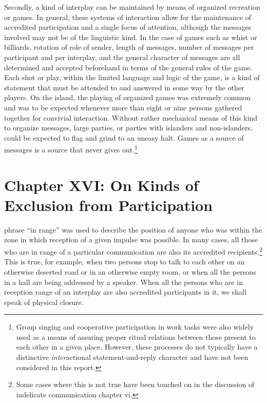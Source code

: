 \documentclass[openany,nobib]{tufte-book}
\let\oldchapter\chapter
\def\chapter{%
  \setcounter{footnote}{0}%
  \oldchapter
}
\begin{document}
Secondly, a kind of interplay can be maintained by means of organized
recreation or games. In general, these systems of interaction allow for
the maintenance of accredited participation and a single focus of
attention, although the messages involved may not be of the linguistic
kind. In the case of games such as whist or billiards, rotation of role
of sender, length of messages, number of messages per participant and
per interplay, and the general character of messages are all determined
and accepted beforehand in terms of the general rules of the game. Each
shot or play, within the limited language and logic of the game, is a
kind of statement that must be attended to and answered in some way by
the other players. On the island, the playing of organized games was
extremely common and was to be expected whenever more than eight or nine
persons gathered together for convivial interaction. Without rather
mechanical means of this kind to organize messages, large parties, or
parties with islanders and non-islanders, could be expected to flag and
grind to an uneasy halt. Games as a source of messages is a source that
never gives out.\footnote{Group singing and cooperative participation in
  work tasks were also widely used as a means of assuring proper ritual
  relations between those present to each other in a given place.
  However, these processes do not typically have a distinctive
  \emph{inter}actional statement-and-reply character and have not been
  considered in this report.}

\chapter[CHAPTER XVI: ON KINDS OF EXCLUSION FROM PARTICIPATION]{Chapter XVI: On Kinds of Exclusion from Participation}
\label{ch:Chapter XVI: On Kinds of Exclusion from Participation}

phrase ``in range'' was used to describe the
position of anyone who was within the zone in which reception of a given
impulse was possible. In many cases, all those who are in range of a
particular communication are also its accredited recipients.\footnote{Some
  cases where this is not true have been touched on in the discussion of
  indelicate communication chapter vi.} This is true, for example, when
two persons stop to talk to each other on an otherwise deserted road or
in an otherwise empty room, or when all the persons in a hall are being
addressed by a speaker. When all the persons who are in reception range
of an interplay are also accredited participants in it, we shall speak
of physical closure.
\end{document}
